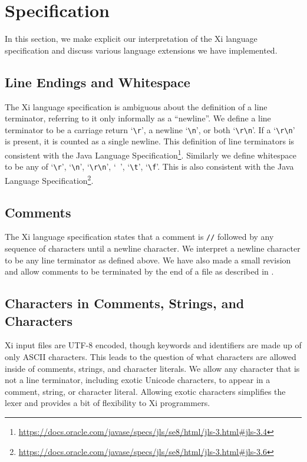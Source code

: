 \documentclass{hw}
\begin{document}
\section{Specification}\label{sec:specification}
In this section, we make explicit our interpretation of the Xi language
specification and discuss various language extensions we have implemented.

\subsection{Line Endings and Whitespace}
The Xi language specification is ambiguous about the definition of a line
terminator, referring to it only informally as a ``newline''. We define a line
terminator to be a carriage return `\verb$\r$', a newline `\verb$\n$', or both
`\verb$\r\n$'. If a `\verb$\r\n$' is present, it is counted as a single
newline. This definition of line terminators is consistent with the Java
Language
Specification\footnote{\url{https://docs.oracle.com/javase/specs/jls/se8/html/jls-3.html\#jls-3.4}}.
Similarly we define whitespace to be any of `\verb$\r$', `\verb$\n$',
`\verb$\r\n$', `\verb$ $', `\verb$\t$', `\verb$\f$'. This is also consistent with
the Java Language
Specification\footnote{\url{https://docs.oracle.com/javase/specs/jls/se8/html/jls-3.html\#jls-3.6}}.

\subsection{Comments}
The Xi language specification states that a comment is \texttt{//} followed by
any sequence of characters until a newline character. We interpret a newline
character to be any line terminator as defined above. We have also made a small
revision and allow comments to be terminated by the end of a file as described
in .

\subsection{Characters in Comments, Strings, and Characters}
Xi input files are UTF-8 encoded, though keywords and identifiers are made up
of only ASCII characters. This leads to the question of what characters are
allowed inside of comments, strings, and character literals. We allow any
character that is not a line terminator, including exotic Unicode characters,
to appear in a comment, string, or character literal. Allowing exotic
characters simplifies the lexer and provides a bit of flexibility to
Xi programmers.
\end{document}
